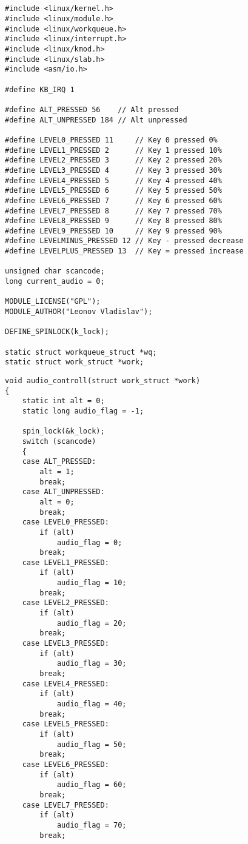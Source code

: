 \begin{appendices}

\chapter{}
\begin{lstlisting}[caption={Листинг audio\_module.c(часть 1)}]
#include <linux/kernel.h>
#include <linux/module.h>
#include <linux/workqueue.h>
#include <linux/interrupt.h>
#include <linux/kmod.h>
#include <linux/slab.h>
#include <asm/io.h>

#define KB_IRQ 1

#define ALT_PRESSED 56    // Alt pressed
#define ALT_UNPRESSED 184 // Alt unpressed

#define LEVEL0_PRESSED 11     // Key 0 pressed 0%
#define LEVEL1_PRESSED 2      // Key 1 pressed 10%
#define LEVEL2_PRESSED 3      // Key 2 pressed 20%
#define LEVEL3_PRESSED 4      // Key 3 pressed 30%
#define LEVEL4_PRESSED 5      // Key 4 pressed 40%
#define LEVEL5_PRESSED 6      // Key 5 pressed 50%
#define LEVEL6_PRESSED 7      // Key 6 pressed 60%
#define LEVEL7_PRESSED 8      // Key 7 pressed 70%
#define LEVEL8_PRESSED 9      // Key 8 pressed 80%
#define LEVEL9_PRESSED 10     // Key 9 pressed 90%
#define LEVELMINUS_PRESSED 12 // Key - pressed decrease
#define LEVELPLUS_PRESSED 13  // Key = pressed increase

unsigned char scancode;
long current_audio = 0;

MODULE_LICENSE("GPL");
MODULE_AUTHOR("Leonov Vladislav");

DEFINE_SPINLOCK(k_lock);

static struct workqueue_struct *wq;
static struct work_struct *work;   
\end{lstlisting}
\clearpage


\begin{lstlisting}[caption={Листинг audio\_module.c(часть 2)}]
void audio_controll(struct work_struct *work)
{
    static int alt = 0;
    static long audio_flag = -1;

    spin_lock(&k_lock);
    switch (scancode)
    {
    case ALT_PRESSED:
        alt = 1;
        break;
    case ALT_UNPRESSED:
        alt = 0;
        break;
    case LEVEL0_PRESSED:
        if (alt)
            audio_flag = 0;
        break;
    case LEVEL1_PRESSED:
        if (alt)
            audio_flag = 10;
        break;
    case LEVEL2_PRESSED:
        if (alt)
            audio_flag = 20;
        break;
    case LEVEL3_PRESSED:
        if (alt)
            audio_flag = 30;
        break;
    case LEVEL4_PRESSED:
        if (alt)
            audio_flag = 40;
        break;
    case LEVEL5_PRESSED:
        if (alt)
            audio_flag = 50;
        break;
    case LEVEL6_PRESSED:
        if (alt)
            audio_flag = 60;
        break;
    case LEVEL7_PRESSED:
        if (alt)
            audio_flag = 70;
        break;
\end{lstlisting}


\end{appendices}
